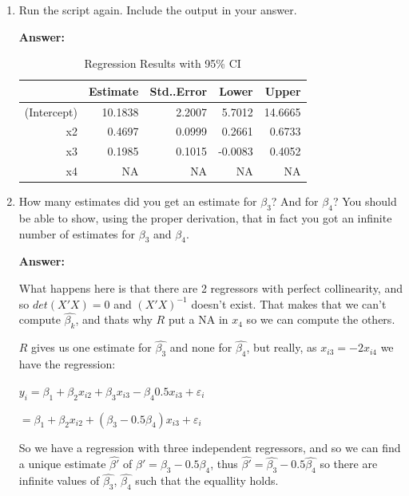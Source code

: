 \documentclass[12pt,a4paper]{article}
\begin{document}
\begin{enumerate}[label=(\roman*)]
  \item Run the script again. Include the output in your answer.
  
  \textbf{Answer:} 

  \begin{table}[ht]
\centering
\caption{Regression Results with 95\% CI } 
\label{tab:regression2}
\begin{tabular}{rrrrr}
  \hline
 & Estimate & Std..Error & Lower & Upper \\ 
  \hline
(Intercept) & 10.1838  &  2.2007 & 5.7012 & 14.6665 \\ 
  x2 & 0.4697  &  0.0999  & 0.2661 & 0.6733 \\ 
  x3 & 0.1985  &  0.1015 & -0.0083 & 0.4052 \\ 
  x4 & NA & NA & NA & NA \\ 
   \hline
\end{tabular}
\end{table}
  
  
  \item How many estimates did you get an estimate for $\beta_3$? And for $\beta_4$? You should be able to show, using the proper derivation, that in fact you got an infinite number of estimates for $\beta_3$ and $\beta_4$.
  
  \textbf{Answer:} 

  What happens here is that there are 2 regressors with perfect collinearity, and so $det(X'X)=0$ and $(X'X)^{-1}$ doesn't exist. That makes that we can't compute $\hat{\beta_k}$, and thats why $R$ put a NA in $x_4$ so we can compute the others.

  $R$ gives us one estimate for $\hat{\beta_3}$ and none for $\hat{\beta_4}$, but really, as $x_{i3} = -2x_{i4}$ we have the regression:

  \begin{center}
      $y_i = \beta_1 + \beta_2 x_{i2} + \beta_3 x_{i3} - \beta_4 0.5x_{i3} + \varepsilon_i$

      $= \beta_1 + \beta_2 x_{i2} + (\beta_3 -0.5\beta_4) x_{i3}+ \varepsilon_i$
  \end{center}

  So we have a regression with three independent regressors, and so we can find a unique estimate $\hat{\beta'}$ of $\beta' =\beta_3 -0.5\beta_4 $, thus $\hat{\beta'} =\hat{\beta_3} -0.5\hat{\beta_4} $ so there are infinite values of $\hat{\beta_3}$, $\hat{\beta_4}$ such that the equallity holds.
\end{enumerate}
\end{document}
